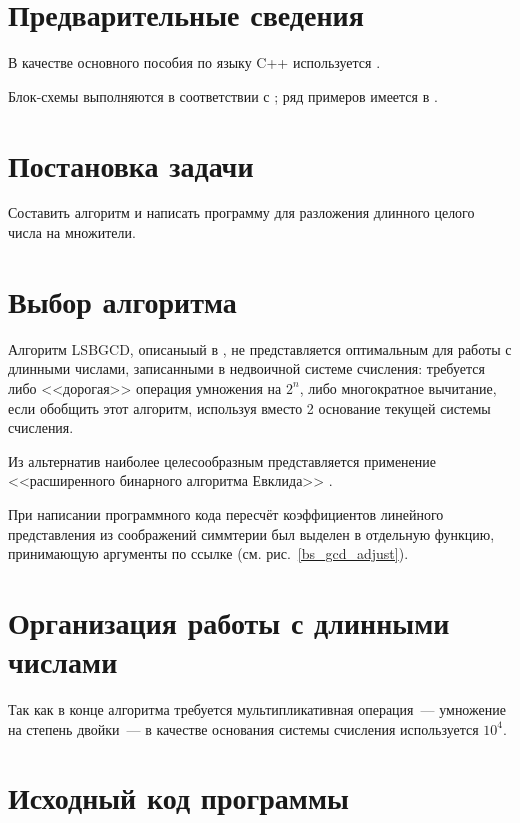 \documentclass[a4paper,12pt]{article} %
\begin{document}
\setcounter{page}{2}

\section*{Предварительные сведения}

В качестве основного пособия по языку C++ используется \cite{chmyhalo}.


Блок-схемы выполняются в соответствии с \cite{gost-block-scheme};
ряд примеров имеется в \cite{wiki-block-scheme}.


\section*{Постановка задачи}
Составить алгоритм и написать программу
для разложения длинного целого числа на множители.


\section*{Выбор алгоритма}

Алгоритм LSBGCD, описаныый в \cite{Glukhov},
не представляется оптимальным для работы с длинными числами,
записанными в недвоичной системе счисления:
требуется либо <<дорогая>> операция умножения на $2^n$,
либо многократное вычитание, если обобщить этот алгоритм,
используя вместо 2 основание текущей системы счисления.

Из альтернатив наиболее целесообразным представляется применение
<<расширенного бинарного алгоритма Евклида>> \cite{gcd-binary}.

При написании программного кода пересчёт коэффициентов линейного представления
из соображений симмтерии был выделен в отдельную функцию,
принимающую аргументы по ссылке (см. рис.~\ref{bs_gcd_adjust}).

\section*{Организация работы с длинными числами}
Так как в конце алгоритма требуется мультипликативная операция~---
умножение на степень двойки~---
в качестве основания системы счисления используется $10^4$.

\section*{Исходный код программы}





\end{document}
